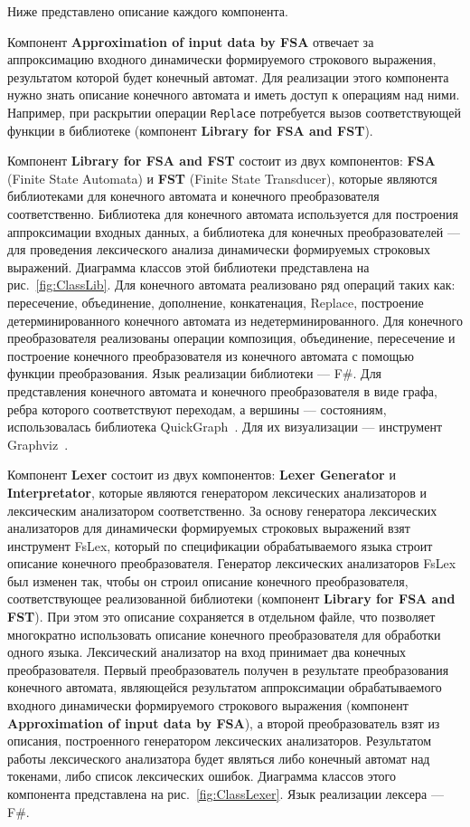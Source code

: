 Ниже представлено описание каждого компонента. 

Компонент \textbf{Approximation of input data by FSA} отвечает за аппроксимацию входного динамически формируемого строкового выражения, результатом которой будет конечный автомат. Для реализации этого компонента нужно знать описание конечного автомата и иметь доступ к операциям над ними. Например, при раскрытии операции \verb|Replace| потребуется вызов соответствующей функции в библиотеке (компонент \textbf{Library for FSA and FST}). 

Компонент \textbf{Library for FSA and FST} состоит из двух компонентов: \textbf{FSA} (Finite State Automata) и \textbf{FST} (Finite State Transducer), которые являются библиотеками для конечного автомата и конечного преобразователя соответственно. Библиотека для конечного автомата используется для построения аппроксимации входных данных, а библиотека для конечных преобразователей --- для проведения лексического анализа динамически формируемых строковых выражений. Диаграмма классов этой библиотеки представлена на рис.~\ref{fig:ClassLib}. Для конечного автомата реализовано ряд операций таких как: пересечение, объединение, дополнение, конкатенация, Replace, построение детерминированного конечного автомата из недетерминированного. Для конечного преобразователя реализованы операции композиция, объединение, пересечение и построение конечного преобразователя из конечного автомата с помощью функции преобразования. Язык реализации библиотеки --- F\#. Для представления конечного автомата и конечного преобразователя в виде графа, ребра которого соответствуют переходам, а вершины --- состояниям, использовалась библиотека QuickGraph~\cite{QuickGraph}. Для их визуализации --- инструмент Graphviz~\cite{Graphviz}.

Компонент \textbf{Lexer} состоит из двух компонентов: \textbf{Lexer Generator} и \textbf{Interpretator}, которые являются генератором лексических анализаторов и лексическим анализатором соответственно. За основу генератора лексических анализаторов для динамически формируемых строковых выражений взят инструмент FsLex, который по спецификации обрабатываемого языка строит описание конечного преобразователя. Генератор лексических анализаторов FsLex был изменен так, чтобы он строил описание конечного преобразователя, соответствующее реализованной библиотеки (компонент \textbf{Library for FSA and FST}). При этом это описание сохраняется в отдельном файле, что позволяет многократно использовать описание конечного преобразователя для обработки одного языка. Лексический анализатор на вход принимает два конечных преобразователя. Первый преобразователь получен в результате преобразования конечного автомата, являющейся результатом аппроксимации обрабатываемого входного динамически формируемого строкового выражения (компонент \textbf{Approximation of input data by FSA}), а второй преобразователь взят из описания, построенного генератором лексических анализаторов. Результатом работы лексического анализатора будет являться либо конечный автомат над токенами, либо список лексических ошибок. Диаграмма классов этого компонента представлена на рис.~\ref{fig:ClassLexer}. Язык реализации лексера --- F\#.

